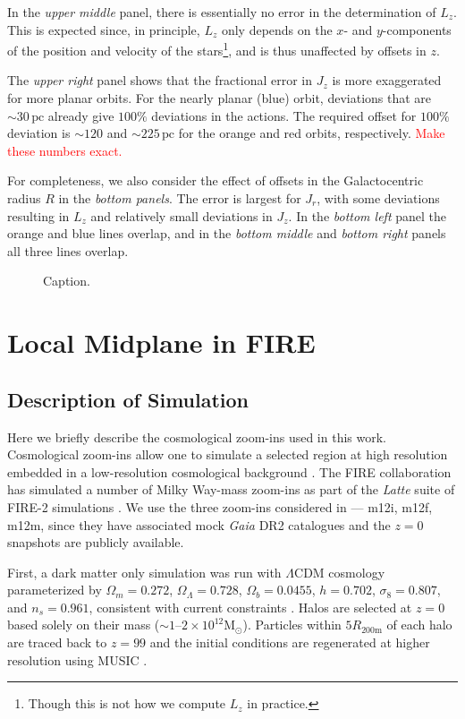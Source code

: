 \documentclass[twocolumn]{aastex62}
\newcommand{\Gus}[1]{\textcolor{red}{#1}}
\newcommand{\Msun}{\text{M}_\odot}
\newcommand{\pc}{\text{pc}}
\newcommand{\z}{z}
\begin{document}
In the {\em upper middle} panel, there is essentially no error in the
determination of $L_z$. This is expected since, in principle, $L_z$ only
depends on the $x$- and $y$-components of the position and velocity of the
stars\footnote{Though this is not how we compute $L_z$ in practice.}, and is
thus unaffected by offsets in $z$.

The {\em upper right} panel shows that the fractional error in $J_z$ is more
exaggerated for more planar orbits. For the nearly planar (blue) orbit,
deviations that are $\sim30\,\pc$ already give $100\%$ deviations in the
actions. The required offset for $100\%$ deviation is $\sim120$ and
$\sim225\,\pc$ for the orange and red orbits, respectively. \Gus{Make these
numbers exact.}

For completeness, we also consider the effect of offsets in the Galactocentric
radius $R$ in the {\em bottom panels}. The error is largest for $J_r$, with
some deviations resulting in $L_z$ and relatively small deviations in $J_z$.
In the {\em bottom left} panel the orange and blue lines overlap, and in the
{\em bottom middle} and {\em bottom right} panels all three lines overlap.

\begin{figure*}
\caption{Caption.}
\label{fig:many_orbit_wrong_ref}
\end{figure*}

\section{Local Midplane in FIRE} \label{sec:local_fire}
\subsection{Description of Simulation} \label{ssec:cosmozoom}
Here we briefly describe the cosmological zoom-ins used in this work.
Cosmological zoom-ins allow one to simulate a selected region at high
resolution embedded in a low-resolution cosmological background
\citep[e.g.][]{1993ApJ...412..455K,2014MNRAS.437.1894O}. The FIRE
collaboration has simulated a number of Milky Way-mass zoom-ins as part of the
{\em Latte} suite of FIRE-2 simulations
\citep{2016ApJ...827L..23W,2018MNRAS.481.4133G}. We use the three zoom-ins
considered in \citet{2018arXiv180610564S} --- m12i, m12f, m12m, since they
have associated mock {\em Gaia} DR2 catalogues and the $z=0$ snapshots are
publicly available.

First, a dark matter only simulation was run with $\Lambda$CDM cosmology
parameterized by $\Omega_m = 0.272$, $\Omega_{\Lambda} = 0.728$, $\Omega_b =
0.0455$, $h = 0.702$, $\sigma_8 = 0.807$, and $n_s = 0.961$, consistent with
current constraints \citep{2018arXiv180706209P}. Halos are selected at $z=0$
based solely on their mass ($\sim 1\text{--}2 \times 10^{12} \Msun$).
Particles within $5 R_{200\text{m}}$ of each halo are traced back to $\z=99$
and the initial conditions are regenerated at higher resolution using MUSIC
\citep{2011MNRAS.415.2101H}.
\end{document}
